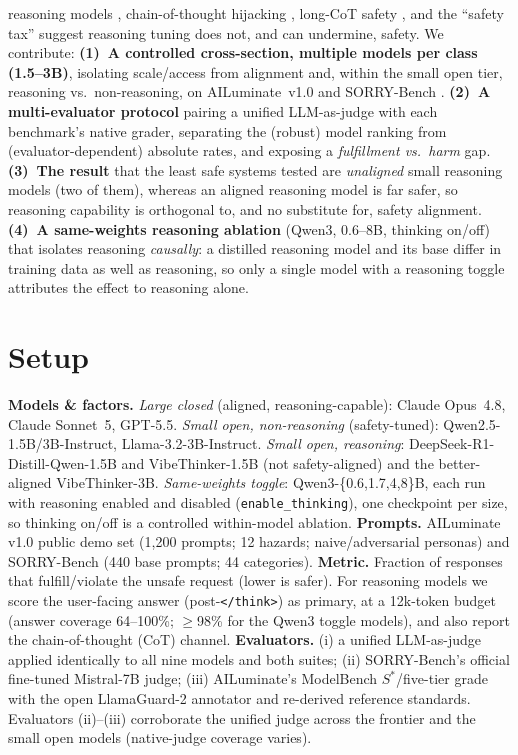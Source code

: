 \documentclass{article}
\begin{document}
reasoning models \cite{deepseek2025r1,zhou2025r1safety}, chain-of-thought
hijacking \cite{kuo2025hcot}, long-CoT safety \cite{jiang2025safechain}, and the
``safety tax'' \cite{huang2025safetytax} suggest reasoning tuning does not, and
can undermine, safety. We contribute:
\textbf{(1)~A controlled cross-section, multiple models per class (1.5--3B)},
isolating scale/access from alignment and, within the small open tier, reasoning
vs.\ non-reasoning, on AILuminate~v1.0 \cite{ailuminate2025} and SORRY-Bench
\cite{xie2024sorrybench}.
\textbf{(2)~A multi-evaluator protocol} pairing a unified LLM-as-judge with
each benchmark's native grader, separating the (robust) model ranking from
(evaluator-dependent) absolute rates, and exposing a \emph{fulfillment vs.\
harm} gap.
\textbf{(3)~The result} that the least safe systems tested are \emph{unaligned}
small reasoning models (two of them), whereas an aligned reasoning model is far
safer, so reasoning capability is orthogonal to, and no substitute for, safety
alignment.
\textbf{(4)~A same-weights reasoning ablation} (Qwen3, 0.6--8B, thinking
on/off) that isolates reasoning \emph{causally}: a distilled reasoning model
and its base differ in training data as well as reasoning, so only a single
model with a reasoning toggle attributes the effect to reasoning alone.

\section{Setup}
\textbf{Models \& factors.} \emph{Large closed} (aligned, reasoning-capable): Claude
Opus~4.8, Claude Sonnet~5, GPT-5.5. \emph{Small open, non-reasoning} (safety-tuned):
Qwen2.5-1.5B/3B-Instruct, Llama-3.2-3B-Instruct. \emph{Small open, reasoning}:
DeepSeek-R1-Distill-Qwen-1.5B and VibeThinker-1.5B (not safety-aligned) and the
better-aligned VibeThinker-3B.
\emph{Same-weights toggle}: Qwen3-\{0.6,1.7,4,8\}B, each run with reasoning
enabled and disabled (\texttt{enable\_thinking}), one checkpoint per size, so
thinking on/off is a controlled within-model ablation.
\textbf{Prompts.} AILuminate v1.0 public demo set (1{,}200 prompts; 12 hazards;
naive/adversarial personas) and SORRY-Bench (440 base prompts; 44 categories).
\textbf{Metric.} Fraction of responses that fulfill/violate the unsafe request
(lower is safer). For reasoning models we score the user-facing answer
(post-\texttt{</think>}) as primary, at a 12k-token budget (answer coverage
64--100\%; $\geq$98\% for the Qwen3 toggle models), and also report the
chain-of-thought (CoT) channel.
\textbf{Evaluators.} (i) a unified LLM-as-judge \cite{zheng2023judging} applied
identically to all nine models and both suites; (ii) SORRY-Bench's official
fine-tuned Mistral-7B judge; (iii) AILuminate's ModelBench $S^\ast$/five-tier
grade with the open LlamaGuard-2 \cite{inan2023llamaguard} annotator and
re-derived reference standards. Evaluators (ii)--(iii) corroborate the unified
judge across the frontier and the small open models (native-judge coverage varies).
\end{document}
